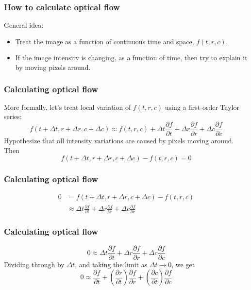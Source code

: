 \documentclass{beamer}
\begin{document}
\begin{frame}
  \frametitle{How to calculate optical flow}

  General idea:
  \begin{itemize}
    \item Treat the image as a function of continuous time and
      space, $f(t,r,c)$.
    \item If the image intensity is changing, as a function of time,
      then try to explain it by moving pixels around.
  \end{itemize}
\end{frame}

\begin{frame}
  \frametitle{Calculating optical flow}

  More formally, let's treat local variation of $f(t,r,c)$ using a
  first-order Taylor series:
  \[
  f\left(t+\Delta t,r+\Delta r,c+\Delta c\right)\approx f(t,r,c) +
  \Delta t\frac{\partial f}{\partial t}+
  \Delta r\frac{\partial f}{\partial r}+
  \Delta c\frac{\partial f}{\partial c}
  \]
  Hypothesize that all intensity variations are caused by pixels
  moving around.  Then
  \[
  f\left(t+\Delta t,r+\Delta r,c+\Delta c\right) - f(t,r,c) = 0
  \]
  
\end{frame}


\begin{frame}
  \frametitle{Calculating optical flow}

  \begin{align*}
    0 & =   f\left(t+\Delta t,r+\Delta r,c+\Delta c\right) - f(t,r,c) \\
    &\approx   \Delta t\frac{\partial f}{\partial t}+
    \Delta r\frac{\partial f}{\partial r}+
    \Delta c\frac{\partial f}{\partial c}
  \end{align*}
\end{frame}
\begin{frame}
  \frametitle{Calculating optical flow}

  \[
  0 \approx   \Delta t\frac{\partial f}{\partial t}+
  \Delta r\frac{\partial f}{\partial r}+
  \Delta c\frac{\partial f}{\partial c}
  \]
  Dividing through by $\Delta t$, and taking the limit as $\Delta
  t\rightarrow 0$, we get
  \[
  0 \approx   \frac{\partial f}{\partial t}+
  \left(\frac{\partial r}{\partial t}\right)\frac{\partial f}{\partial r}+
  \left(\frac{\partial c}{\partial t}\right)\frac{\partial f}{\partial c}
  \]
\end{frame}
\end{document}
